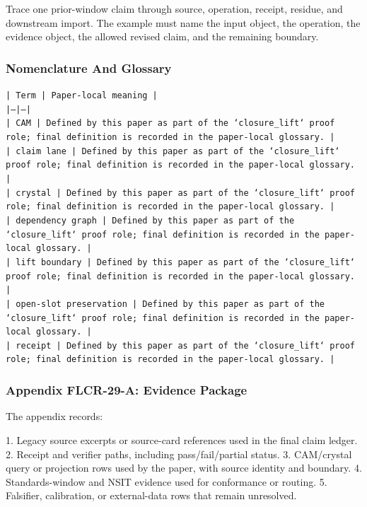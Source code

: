 \documentclass[11pt]{article}
\begin{document}
Trace one prior-window claim through source, operation, receipt, residue, and downstream import. The example must name the input object, the operation,
the evidence object, the allowed revised claim, and the remaining boundary.

\subsubsection*{Nomenclature And Glossary}

\noindent\texttt{| Term | Paper-local meaning |}\\
\noindent\texttt{|---|---|}\\
\noindent\texttt{| CAM | Defined by this paper as part of the `closure\_lift` proof role; final definition is recorded in the paper-local glossary. |}\\
\noindent\texttt{| claim lane | Defined by this paper as part of the `closure\_lift` proof role; final definition is recorded in the paper-local glossary. |}\\
\noindent\texttt{| crystal | Defined by this paper as part of the `closure\_lift` proof role; final definition is recorded in the paper-local glossary. |}\\
\noindent\texttt{| dependency graph | Defined by this paper as part of the `closure\_lift` proof role; final definition is recorded in the paper-local glossary. |}\\
\noindent\texttt{| lift boundary | Defined by this paper as part of the `closure\_lift` proof role; final definition is recorded in the paper-local glossary. |}\\
\noindent\texttt{| open-slot preservation | Defined by this paper as part of the `closure\_lift` proof role; final definition is recorded in the paper-local glossary. |}\\
\noindent\texttt{| receipt | Defined by this paper as part of the `closure\_lift` proof role; final definition is recorded in the paper-local glossary. |}\\

\subsubsection*{Appendix FLCR-29-A: Evidence Package}

The appendix records:

1. Legacy source excerpts or source-card references used in the final claim ledger.
2. Receipt and verifier paths, including pass/fail/partial status.
3. CAM/crystal query or projection rows used by the paper, with source identity and boundary.
4. Standards-window and NSIT evidence used for conformance or routing.
5. Falsifier, calibration, or external-data rows that remain unresolved.
\end{document}

